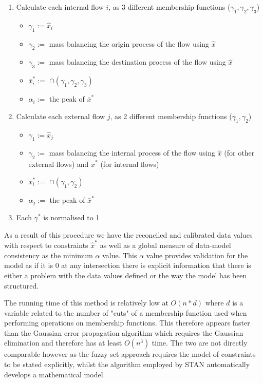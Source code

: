 \documentclass[ %
                    author={Tom Jager},
                supervisor={Dr. Daniel Schien},
                    degree={MEng},
                     title={A Bayesian Inference Engine for UMIS Structured Data},
                  subtitle={},
                      type={research},
                      year={2019} ]{dissertation}
\begin{document}
    \begin{enumerate}
        \item Calculate each internal flow $i$, as 3 different membership functions ($\gamma_1, \gamma_2, \gamma_3$)
        \begin{itemize}
            \item $\gamma_1 := \hat{x}_i$ 
            \item $\gamma_2 := $ mass balancing the origin process of the flow using    $\hat{x}$
            \item $\gamma_3 := $ mass balancing the destination process of the flow using $\hat{x}$
            \item $\bar{x}^*_i := $  $\cap(\gamma_1, \gamma_2, \gamma_3)$
            \item $\alpha_{i} := $ the peak of $\bar{x}^*$
        \end{itemize}
        
        \item Calculate each external flow $j$, as 2 different membership functions ($\gamma_1, \gamma_2$)
        \begin{itemize}
            \item $\gamma_1 := \hat{x}_j$ 
            \item $\gamma_2 := $ mass balancing the internal process of the flow using $\hat{x}$ (for other external flows) and $\bar{x}^*$ (for internal flows)
            \item $\bar{x}^*_i := $  $\cap(\gamma_1, \gamma_2)$
            \item $\alpha_{j} := $ the peak of $\bar{x}^*$
        \end{itemize}
        
        \item Each $\gamma^*$ is normalised to 1
    \end{enumerate}

As a result of this procedure we have the reconciled and calibrated data values with respect to constraints $\hat{x}^*$ as well as a global measure of data-model consistency as the minimum $\alpha$ value. This $\alpha$ value provides validation for the model as if it is 0 at any intersection there is explicit information that there is either a problem with the data values defined or the way the model has been structured.

The running time of this method is relatively low at $O(n*d)$ where $d$ is a variable related to the number of "cuts" of a membership function used when performing operations on membership functions. This therefore appears faster than the Gaussian error propagation algorithm which requires the Gaussian elimination and therefore has at least $O(n^3)$ time. The two are not directly comparable however as the fuzzy set approach requires the model of constraints to be stated explicitly, whilst the algorithm employed by STAN automatically develops a mathematical model.
\end{document}
